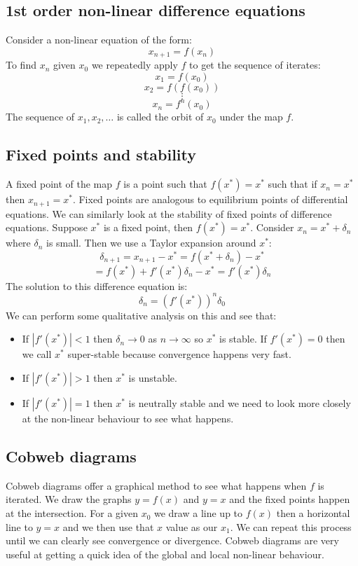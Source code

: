 \documentclass[12pt]{article}
\begin{document}
\subsection*{1st order non-linear difference equations}
Consider a non-linear equation of the form:
\[x_{n+1}=f(x_n)\]
To find \(x_n\) given \(x_0\) we repeatedly apply \(f\) to get the sequence of iterates:
\[x_1=f(x_0)\]
\[x_2=f(f(x_0))\]
\[\vdots\]
\[x_n=f^n(x_0)\]
The sequence of \(x_1,x_2,\dots\) is called the orbit of \(x_0\) under the map \(f\).
\subsection*{Fixed points and stability}
A fixed point of the map \(f\) is a point such that \(f(x^*)=x^*\) such that if \(x_n=x^*\) then \(x_{n+1}=x^*\). Fixed points are analogous to equilibrium points of differential equations. We can similarly look at the stability of fixed points of difference equations. Suppose \(x^*\) is a fixed point, then \(f(x^*)=x^*\). Consider \(x_n=x^*+\delta_n\) where \(\delta_n\) is small. Then we use a Taylor expansion around \(x^*\):
\[\delta_{n+1}=x_{n+1}-x^*=f(x^*+\delta_n)-x^*\]
\[=f(x^*)+f'(x^*)\delta_n-x^*=f'(x^*)\delta_n\]
The solution to this difference equation is:
\[\delta_n=(f'(x^*))^n\delta_0\]
We can perform some qualitative analysis on this and see that:
\begin{itemize}
    \item If \(|f'(x^*)|<1\) then \(\delta_n\to 0\) as \(n\to \infty\) so \(x^*\) is stable. If \(f'(x^*)=0\) then we call \(x^*\) super-stable because convergence happens very fast.
    \item If \(|f'(x^*)|>1\) then \(x^*\) is unstable.
    \item If \(|f'(x^*)|=1\) then \(x^*\) is neutrally stable and we need to look more closely at the non-linear behaviour to see what happens.
\end{itemize}
\subsection*{Cobweb diagrams}
Cobweb diagrams offer a graphical method to see what happens when \(f\) is iterated. We draw the graphs \(y=f(x)\) and \(y=x\) and the fixed points happen at the intersection. For a given \(x_0\) we draw a line up to \(f(x)\) then a horizontal line to \(y=x\) and we then use that \(x\) value as our \(x_1\). We can repeat this process until we can clearly see convergence or divergence. Cobweb diagrams are very useful at getting a quick idea of the global and local non-linear behaviour.
\end{document}
